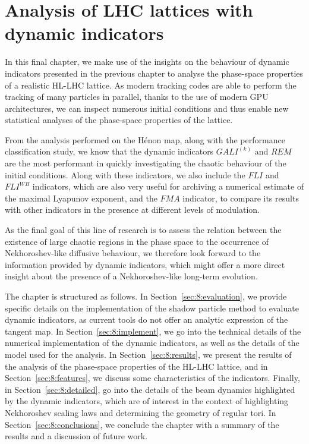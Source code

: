 \chapter{Analysis of LHC lattices with dynamic indicators}\label{ch:dyn-lhc}

In this final chapter, we make use of the insights on the behaviour of dynamic indicators presented in the previous chapter to analyse the phase-space properties of a realistic HL-LHC lattice. As modern tracking codes are able to perform the tracking of many particles in parallel, thanks to the use of modern GPU architectures, we can inspect numerous initial conditions and thus enable new statistical analyses of the phase-space properties of the lattice.

From the analysis performed on the Hénon map, along with the performance classification study, we know that the dynamic indicators $GALI^{(k)}$ and $REM$ are the most performant in quickly investigating the chaotic behaviour of the initial conditions. Along with these indicators, we also include the $FLI$ and $FLI^{WB}$ indicators, which are also very useful for archiving a numerical estimate of the maximal Lyapunov exponent, and the $FMA$ indicator, to compare its results with other indicators in the presence at different levels of modulation.

As the final goal of this line of research is to assess the relation between the existence of large chaotic regions in the phase space to the occurrence of Nekhoroshev-like diffusive behaviour, we therefore look forward to the information provided by dynamic indicators, which might offer a more direct insight about the presence of a Nekhoroshev-like long-term evolution.

The chapter is structured as follows. In Section~\ref{sec:8:evaluation}, we provide specific details on the implementation of the shadow particle method to evaluate dynamic indicators, as current tools do not offer an analytic expression of the tangent map. In Section~\ref{sec:8:implement}, we go into the technical details of the numerical implementation of the dynamic indicators, as well as the details of the model used for the analysis. In Section~\ref{sec:8:results}, we present the results of the analysis of the phase-space properties of the HL-LHC lattice, and in Section~\ref{sec:8:features}, we discuss some characteristics of the indicators. Finally, in Section~\ref{sec:8:detailed}, go into the details of the beam dynamics highlighted by the dynamic indicators, which are of interest in the context of highlighting Nekhoroshev scaling laws and determining the geometry of regular tori. In Section~\ref{sec:8:conclusions}, we conclude the chapter with a summary of the results and a discussion of future work. 


